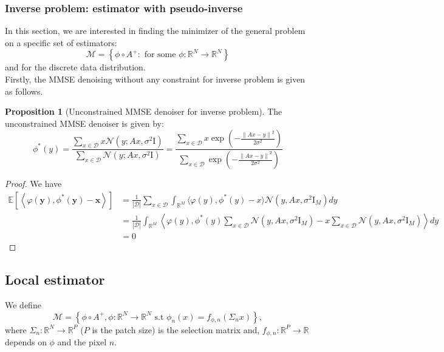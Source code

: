 \documentclass[a4paper,10pt]{article}
\theoremstyle{definition} %
\theoremstyle{definition} %
\newtheorem{proposition}[definition]{Proposition}
\theoremstyle{definition} %
\theoremstyle{definition} %
\newcommand{\R}{\mathbb{R}}
\newcommand{\E}[1]{\mathbb{E} \left[ {#1} \right] }
\newcommand{\Normal}[1]{\mathcal{N}\left( {#1} \right)}
\newcommand{\Id}{\mathrm{I}}
\newcommand{\norm}[1]{\left\| #1 \right \|}
\newcommand{\inner}[1]{\left\langle #1 \right\rangle}
\newcommand{\M}{\mathcal{M}}
\newcommand{\x}{\boldsymbol{x}}
\newcommand{\y}{\boldsymbol{y}}
\newcommand{\0}{\boldsymbol{0}}
\newcommand{\D}{\mathcal{D}}
\begin{document}
\subsubsection{Inverse problem: estimator with pseudo-inverse}
In this section, we are interested in finding the minimizer of the general problem  on a specific set of estimators:
\begin{equation*}
    \M = \left\{ \phi \circ A^+: \mbox{ for some } \phi: \R^N \to \R^N \right\}
\end{equation*}
and for the discrete data distribution. 
\\Firstly, the MMSE denoising without any constraint for inverse problem is given as follows.
\begin{proposition}[Unconstrained MMSE denoiser for inverse problem]
    The unconstrained MMSE denoiser is given by:
    \begin{equation}
        \phi^{*}(y) =  \frac{\sum_{x \in \D} x \Normal{y; A x, \sigma^2 \Id}}{\sum_{x \in \D} \Normal{y; A x, \sigma^2 \Id}} =   \frac{\sum_{x \in \D} x \exp \left( -\frac{\norm{A x - y}^2}{2 \sigma^2} \right) }{\sum_{x \in \D}  \exp \left( -\frac{\norm{A x - y}^2}{2 \sigma^2} \right) }
    \end{equation}
\end{proposition}
\begin{proof}
    We have
    \begin{align*}
        \E{\inner{\varphi(\y), \phi^*(\y) - \x}} &=\frac{1}{|\D|}\sum_{x\in\D}\int_{\R^M} \langle \varphi(y), \phi^*(y)-x\rangle \Normal{y,Ax,\sigma^2 \Id_M} dy\\
        &= \frac{1}{|\D|}\int_{\R^M} \left\langle \varphi(y), \phi^*(y) \sum_{x\in\D}\Normal{y,Ax,\sigma^2 \Id_M}-x \sum_{x\in\D}\Normal{y,Ax,\sigma^2 \Id_M}\right\rangle dy\\
        &=0
    \end{align*} 
\end{proof}

\subsection{Local estimator}
We define 
\begin{equation}
    \M = \left\{\phi \circ A^+, \phi: \R^N \to \R^N \mbox{ s.t } \phi_n(x) = f_{\phi,n}(\Sigma_n x)\right\},
\end{equation}
where $\Sigma_n : \R^N \to \R^P$ ($P$ is the patch size) is the selection matrix and, $f_{\phi, n} : \R^P \to \R$ depends on $\phi$ and the pixel $n$.
\end{document}
